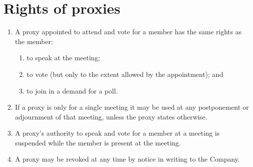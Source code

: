 \section{Rights of proxies}

\begin{enumerate}[label=(\alph*)]
    \item A proxy appointed to attend and vote for a member has the same rights as the member:
    \begin{enumerate}[label=(\roman*)]
        \item to speak at the meeting;
        \item to vote (but only to the extent allowed by the appointment); and
        \item to join in a demand for a poll.
    \end{enumerate}
    
    \item If a proxy is only for a single meeting it may be used at any postponement or adjournment of that meeting, unless the proxy states otherwise.
    
    \item A proxy's authority to speak and vote for a member at a meeting is suspended while the member is present at the meeting.
    
    \item A proxy may be revoked at any time by notice in writing to the Company.
\end{enumerate} 